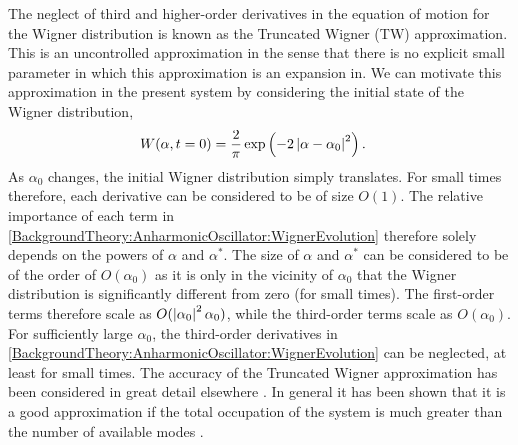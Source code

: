 The neglect of third and higher-order derivatives in the equation of motion for the Wigner distribution is known as the Truncated Wigner (TW) approximation.  This is an uncontrolled approximation in the sense that there is no explicit small parameter in which this approximation is an expansion in.  We can motivate this approximation in the present system by considering the initial state of the Wigner distribution,
\begin{align}
    W(\alpha, t=0) &= \frac{2}{\pi} \exp\left(- 2 \abs{\alpha - \alpha_0}^2\right). \label{BackgroundTheory:WignerFunctionCoherentState}
\end{align}
As $\alpha_0$ changes, the initial Wigner distribution simply translates.  For small times therefore, each derivative can be considered to be of size $O(1)$.  The relative importance of each term in \eqref{BackgroundTheory:AnharmonicOscillator:WignerEvolution} therefore solely depends on the powers of $\alpha$ and $\alpha^*$.  The size of $\alpha$ and $\alpha^*$ can be considered to be of the order of $O(\alpha_0)$ as it is only in the vicinity of $\alpha_0$ that the Wigner distribution is significantly different from zero (for small times).  The first-order terms therefore scale as $O(\left|\alpha_0\right|^2 \alpha_0)$, while the third-order terms scale as $O(\alpha_0)$.  For sufficiently large $\alpha_0$, the third-order derivatives in \eqref{BackgroundTheory:AnharmonicOscillator:WignerEvolution} can be neglected, at least for small times.  The accuracy of the Truncated Wigner approximation has been considered in great detail elsewhere \citep{Sinatra:2002lq,Norrie:2005fk,Norrie:2006vn,Norrie:2006kx,Polkovnikov:2009}.  In general it has been shown that it is a good approximation if the total occupation of the system is much greater than the number of available modes \citep{Norrie:2006vn}.  


